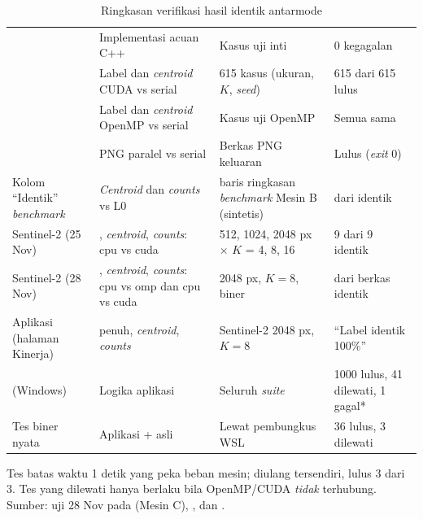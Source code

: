 \begin{table}[H]
\centering
\caption{Ringkasan verifikasi hasil identik antarmode}
\label{tab:verifikasi}
\small
\begin{tabularx}{\textwidth}{L{3.3cm}YL{3.4cm}L{2.5cm}}
\hline
{} &  &  &  \\ \hline
{} & Implementasi acuan C++ & Kasus uji inti & 0 kegagalan \\ \hline
{} & Label dan \emph{centroid} CUDA vs serial & 615 kasus (ukuran, $K$, \emph{seed}) & 615 dari 615 lulus \\ \hline
{} & Label dan \emph{centroid} OpenMP vs serial & Kasus uji OpenMP & Semua sama \\ \hline
{} & PNG paralel vs serial & Berkas PNG keluaran & Lulus (\emph{exit} 0) \\ \hline
Kolom ``Identik'' \emph{benchmark} & \emph{Centroid} dan \emph{counts} vs L0 & \IdentikJumlah{} baris ringkasan \emph{benchmark} Mesin B (sintetis) & \IdentikYa{} dari \IdentikJumlah{} identik \\ \hline
{} Sentinel-2 (25 Nov) & , \emph{centroid}, \emph{counts}: cpu vs cuda & 512, 1024, 2048 px $\times$ $K$ = 4, 8, 16 & 9 dari 9 identik \\ \hline
{} Sentinel-2 (28 Nov) & , \emph{centroid}, \emph{counts}: cpu vs omp dan cpu vs cuda & 2048 px, $K=8$, biner  & \CmpSama{} dari \CmpSama{} berkas identik \\ \hline
Aplikasi (halaman Kinerja) &  penuh, \emph{centroid}, \emph{counts} & Sentinel-2 2048 px, $K=8$ & ``Label identik 100\%'' \\ \hline
{} (Windows) & Logika aplikasi & Seluruh \emph{suite} & 1000 lulus, 41 dilewati, 1 gagal* \\ \hline
Tes biner nyata & Aplikasi +  asli & Lewat pembungkus WSL & 36 lulus, 3 dilewati \\ \hline
\end{tabularx}
\par\smallskip\footnotesize\raggedright *Tes batas waktu 1 detik yang peka beban mesin; diulang tersendiri, lulus 3 dari 3. Tes yang dilewati hanya berlaku bila OpenMP/CUDA \emph{tidak} terhubung. Sumber: uji 28 Nov pada   (Mesin C), , dan .
\end{table}

